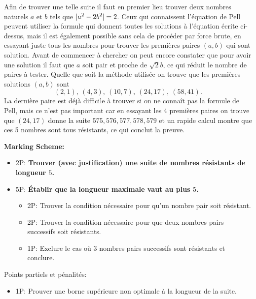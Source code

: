 {Afin de trouver une telle suite il faut en premier lieu trouver deux nombres naturels $a$ et $b$ tels que $\lvert a^2 - 2b^2\rvert = 2$. Ceux qui connaissent l'équation de Pell peuvent utiliser la formule qui donnent toutes les solutions à l'équation écrite ci-dessus, mais il est également possible sans cela de procéder par force brute, en essayant juste tous les nombres pour trouver les premières paires $(a, b)$ qui sont solution. Avant de commencer à chercher on peut encore constater que pour avoir une solution il faut que $a$ soit pair et proche de $\sqrt{2} b$, ce qui réduit le nombre de paires à tester. Quelle que soit la méthode utilisée on trouve que les premières solutions $(a, b)$ sont
\[
    (2, 1),\ (4, 3),\ (10, 7),\ (24, 17),\ (58, 41).
\]
La dernière paire est déjà difficile à trouver si on ne connaît pas la formule de Pell, mais ce n'est pas important car en essayant les 4 premières paires on trouve que $(24, 17)$ donne la suite $575, 576, 577, 578, 579$ et un rapide calcul montre que ces 5 nombres sont tous résistants, ce qui conclut la preuve.

\textbf{Marking Scheme:}
\begin{itemize}
    \item 2P: \textbf{Trouver (avec justification) une suite de nombres résistants de longueur $5$.}
    \item 5P: \textbf{Établir que la longueur maximale vaut au plus $5$.}
    \begin{itemize}
        \item 2P: Trouver la condition nécessaire pour qu'un nombre pair soit résistant.
        \item 2P: Trouver la condition nécessaire pour que deux nombres pairs successifs soit résistants.
        \item 1P: Exclure le cas où 3 nombres pairs successifs sont résistants et conclure.
    \end{itemize}
\end{itemize}

Points partiels et pénalités:
\begin{itemize}
    \item 1P: Prouver une borne supérieure non optimale à la longueur de la suite.
\end{itemize}
}